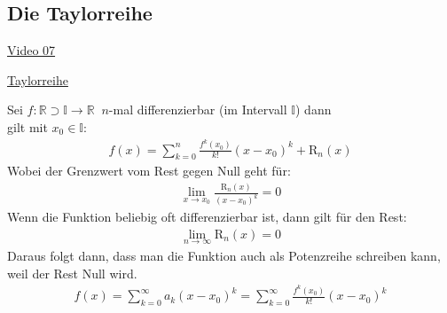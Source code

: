 \subsection{Die Taylorreihe}
\href{https://youtu.be/lnDbJwbBlqY}{Video 07}\\
\begin{center}
	\underline{Taylorreihe}	
\end{center}
Sei $ f:\mathbb{R}\supset \mathbb{I}\rightarrow\mathbb{R}\;\; n$-mal differenzierbar (im Intervall $  \mathbb{I} $) dann \\
gilt mit $ x_0\in \mathbb{I} $:\\
\begin{align*}
	f(x)=\sum\limits_{k=0}^{n}\frac{f^k (x_0)}{k!}(x-x_0)^k+\mathrm{R}_n(x)
\end{align*}
Wobei der Grenzwert vom Rest gegen Null geht für:\\
\begin{align*}
	\lim\limits_ {x\to x_0}\frac{\mathrm{R}_n (x)}{(x-x_0)^k}=0
\end{align*}
Wenn die Funktion beliebig oft differenzierbar ist, dann gilt für den Rest:\\
\begin{align*}
	\lim\limits_ {n\to\infty}\mathrm{R}_n (x)=0
\end{align*}
Daraus folgt dann, dass man die Funktion auch als Potenzreihe schreiben kann, weil der Rest Null wird.\\
\begin{align*}
	f(x)=\sum\limits_{k=0}^{\infty}a_k(x-x_0)^k=\sum\limits_{k=0}^{\infty}\frac{f^k (x_0)}{k!}(x-x_0)^k
\end{align*}
